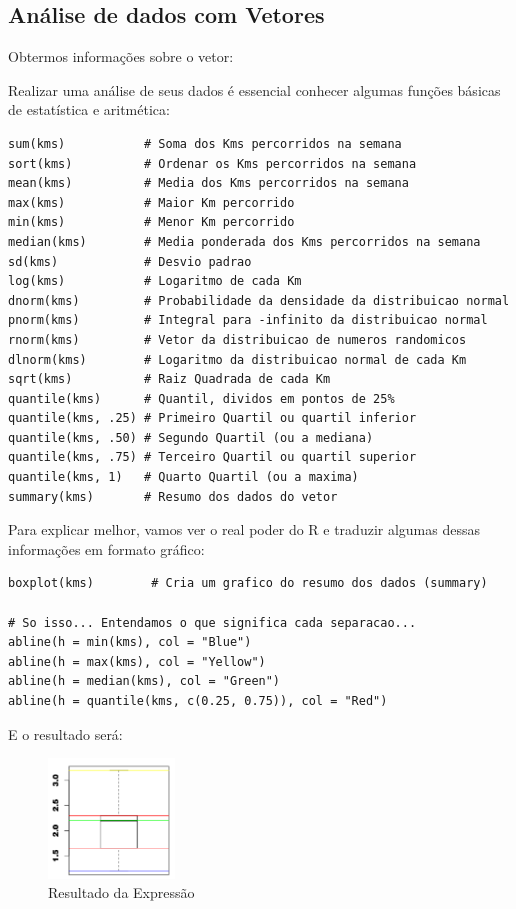 \documentclass[a4paper,11pt]{article}
\begin{document}
\subsection{Análise de dados com Vetores}
Obtermos informações sobre o vetor: \\

Realizar uma análise de seus dados é essencial conhecer algumas funções básicas de estatística e aritmética:
\begin{lstlisting}
sum(kms)           # Soma dos Kms percorridos na semana
sort(kms)          # Ordenar os Kms percorridos na semana
mean(kms)          # Media dos Kms percorridos na semana
max(kms)           # Maior Km percorrido
min(kms)           # Menor Km percorrido
median(kms)        # Media ponderada dos Kms percorridos na semana
sd(kms)            # Desvio padrao
log(kms)           # Logaritmo de cada Km
dnorm(kms)         # Probabilidade da densidade da distribuicao normal
pnorm(kms)         # Integral para -infinito da distribuicao normal
rnorm(kms)         # Vetor da distribuicao de numeros randomicos
dlnorm(kms)        # Logaritmo da distribuicao normal de cada Km
sqrt(kms)          # Raiz Quadrada de cada Km
quantile(kms)      # Quantil, dividos em pontos de 25%
quantile(kms, .25) # Primeiro Quartil ou quartil inferior
quantile(kms, .50) # Segundo Quartil (ou a mediana)
quantile(kms, .75) # Terceiro Quartil ou quartil superior
quantile(kms, 1)   # Quarto Quartil (ou a maxima)
summary(kms)       # Resumo dos dados do vetor
\end{lstlisting}

Para explicar melhor, vamos ver o real poder do R e traduzir algumas dessas informações em formato gráfico:
\begin{lstlisting}
boxplot(kms)        # Cria um grafico do resumo dos dados (summary)

# So isso... Entendamos o que significa cada separacao...
abline(h = min(kms), col = "Blue")
abline(h = max(kms), col = "Yellow")
abline(h = median(kms), col = "Green")
abline(h = quantile(kms, c(0.25, 0.75)), col = "Red")
\end{lstlisting}

E o resultado será:
\begin{figure}[H]
	\centering
	\includegraphics[width=0.3\textwidth]{imagens/grafico01.png}
	\caption{Resultado da Expressão}
\end{figure}
\end{document}
